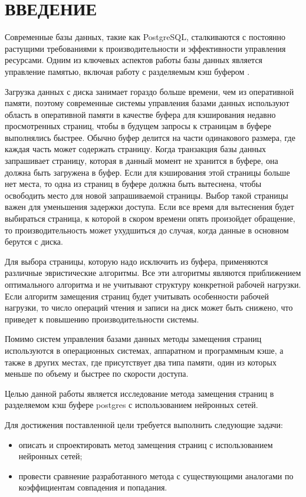 \chapter*{ВВЕДЕНИЕ}

Современные базы данных, такие как PostgreSQL, сталкиваются с постоянно растущими требованиями к производительности и эффективности управления ресурсами.
Одним из ключевых аспектов работы базы данных является управление памятью, включая работу с разделяемым кэш буфером \cite{yuan2022learned}.

Загрузка данных с диска занимает гораздо больше времени, чем из оперативной памяти, поэтому современные системы управления базами данных используют область в оперативной памяти в качестве буфера для кэширования недавно просмотренных страниц, чтобы в будущем запросы к страницам в буфере выполнялись быстрее. 
Обычно буфер делится на части одинакового размера, где каждая часть может содержать страницу. 
Когда транзакция базы данных запрашивает страницу, которая в данный момент не хранится в буфере, она должна быть загружена в буфер.
Если для кэширования этой страницы больше нет места, то одна из страниц в буфере должна быть вытеснена, чтобы освободить место для новой запрашиваемой страницы. 
Выбор такой страницы важен для уменьшения задержки доступа.
Если все время для вытеснения будет выбираться страница, к которой в скором времени опять произойдет обращение, то производительность может ухудшиться до случая, когда данные в основном берутся с диска.

Для выбора страницы, которую надо исключить из буфера, применяются различные эвристические алгоритмы.
Все эти алгоритмы являются приближением оптимального алгоритма и не учитывают структуру конкретной рабочей нагрузки.
Если алгоритм замещения страниц будет учитывать особенности рабочей нагрузки, то число операций чтения и записи на диск может быть снижено, что приведет к повышению производительности системы.

Помимо систем управления базами данных методы замещения страниц используются в операционных системах, аппаратном и программным кэше, а также в других местах, где присутствует два типа памяти, один из которых меньше по объему и быстрее по скорости доступа.

Целью данной работы является исследование метода замещения страниц в разделяемом кэш буфере postgres с использованием нейронных сетей.

Для достижения поставленной цели требуется выполнить следующие задачи:
\begin{itemize}
	\item описать и спроектировать метод замещения страниц с использованием нейронных сетей;
	\item провести сравнение разработанного метода с существующими аналогами по коэффициентам совпадения и попадания.
\end{itemize}